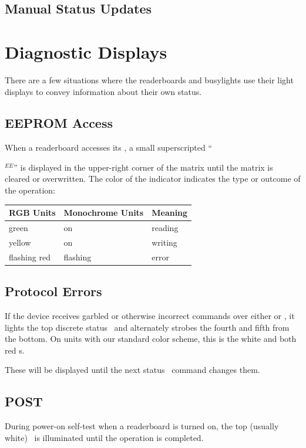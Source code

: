 \subsection{}
\subsection{Manual Status Updates}
\section{Diagnostic Displays}
There are a few situations where the readerboards and busylights use their light displays to convey
information about their own status.

\subsection{EEPROM Access}
When a readerboard accesses its , a small superscripted ``\strut$^{EE}$'' is displayed
in the upper-right corner of the matrix until the matrix is cleared or overwritten.
The color of the indicator indicates the type or outcome of the operation:
\begin{center}
	\begin{tabular}{lll}\toprule
		\bfseries RGB Units & \bfseries Monochrome Units & \bfseries Meaning\\\midrule
		green & on & reading \\
		yellow & on & writing \\
		flashing red & flashing & error \\
		\bottomrule
	\end{tabular}
\end{center}

\subsection{Protocol Errors}
If the device receives garbled or otherwise incorrect commands over either  or ,
it lights the top discrete status \led\ and alternately strobes the fourth and fifth from the bottom. On units with our
standard color scheme, this is the white and both red \led s. 

These will be displayed until the next status \led\ command changes them.

\subsection{POST}
During power-on self-test when a readerboard is turned on, the top (usually white) \led\ is illuminated until the  operation is completed.

